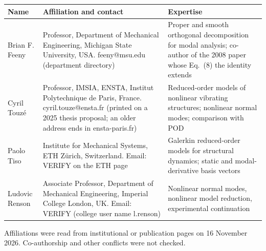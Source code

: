 \documentclass[letter]{nld}
\begin{document}
\medskip
{\small
\noindent\begin{tabular}{@{}>{\raggedright\arraybackslash}p{}>{\raggedright\arraybackslash}p{}>{\raggedright\arraybackslash}p{}@{}}
\toprule
Name & Affiliation and contact & Expertise\\ \midrule
Brian F. Feeny & Professor, Department of Mechanical Engineering, Michigan State University, USA. feeny@msu.edu (department directory) & Proper and smooth orthogonal decomposition for modal analysis; co-author of the 2008 paper whose Eq.~(8) the identity extends\\[4pt]
Cyril Touz\'e & Professor, IMSIA, ENSTA, Institut Polytechnique de Paris, France. cyril.touze@ensta.fr (printed on a 2025 thesis proposal; an older address ends in ensta-paris.fr) & Reduced-order models of nonlinear vibrating structures; nonlinear normal modes; comparison with POD\\[4pt]
Paolo Tiso & Institute for Mechanical Systems, ETH Z\"urich, Switzerland. Email: VERIFY on the ETH page & Galerkin reduced-order models for structural dynamics; static and modal-derivative basis vectors\\[4pt]
Ludovic Renson & Associate Professor, Department of Mechanical Engineering, Imperial College London, UK. Email: VERIFY (college user name l.renson) & Nonlinear normal modes, nonlinear model reduction, experimental continuation\\
\bottomrule
\end{tabular}}

\medskip
{\small\noindent Affiliations were read from institutional or publication pages on 16 November 2026. Co-authorship and other conflicts were not checked.}
\end{document}
